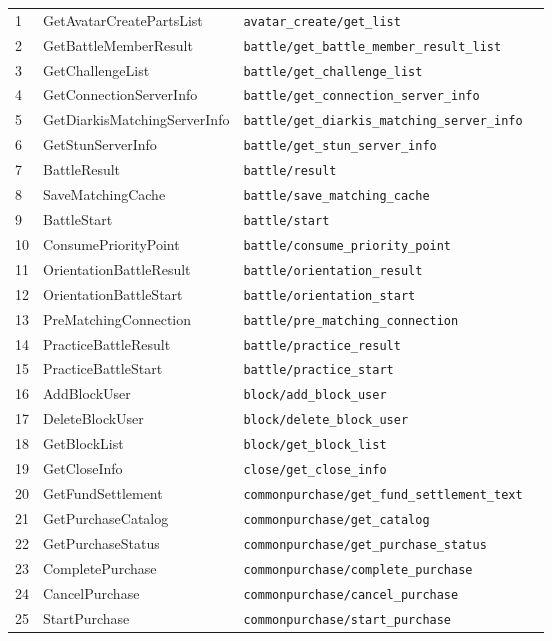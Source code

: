 \begin{longtable}{p{} p{} p{} p{}}
1   & GetAvatarCreatePartsList & \texttt{avatar\_create/get\_list} \\
2   & GetBattleMemberResult & \texttt{battle/get\_battle\_member\_result\_list} \\
3   & GetChallengeList & \texttt{battle/get\_challenge\_list} \\
4   & GetConnectionServerInfo & \texttt{battle/get\_connection\_server\_info} \\
5   & GetDiarkisMatchingServerInfo & \texttt{battle/get\_diarkis\_matching\_server\_info} \\
6   & GetStunServerInfo & \texttt{battle/get\_stun\_server\_info} \\
7   & BattleResult & \texttt{battle/result} \\
8   & SaveMatchingCache & \texttt{battle/save\_matching\_cache} \\
9   & BattleStart & \texttt{battle/start} \\
10  & ConsumePriorityPoint & \texttt{battle/consume\_priority\_point} \\
11  & OrientationBattleResult & \texttt{battle/orientation\_result} \\
12  & OrientationBattleStart & \texttt{battle/orientation\_start} \\
13  & PreMatchingConnection & \texttt{battle/pre\_matching\_connection} \\
14  & PracticeBattleResult & \texttt{battle/practice\_result} \\
15  & PracticeBattleStart & \texttt{battle/practice\_start} \\
16  & AddBlockUser & \texttt{block/add\_block\_user} \\
17  & DeleteBlockUser & \texttt{block/delete\_block\_user} \\
18  & GetBlockList & \texttt{block/get\_block\_list} \\
19  & GetCloseInfo & \texttt{close/get\_close\_info} \\
20  & GetFundSettlement & \texttt{commonpurchase/get\_fund\_settlement\_text} \\
21  & GetPurchaseCatalog & \texttt{commonpurchase/get\_catalog} \\
22  & GetPurchaseStatus & \texttt{commonpurchase/get\_purchase\_status} \\
23  & CompletePurchase & \texttt{commonpurchase/complete\_purchase} \\
24  & CancelPurchase & \texttt{commonpurchase/cancel\_purchase} \\
25  & StartPurchase & \texttt{commonpurchase/start\_purchase} \\

\end{longtable}
